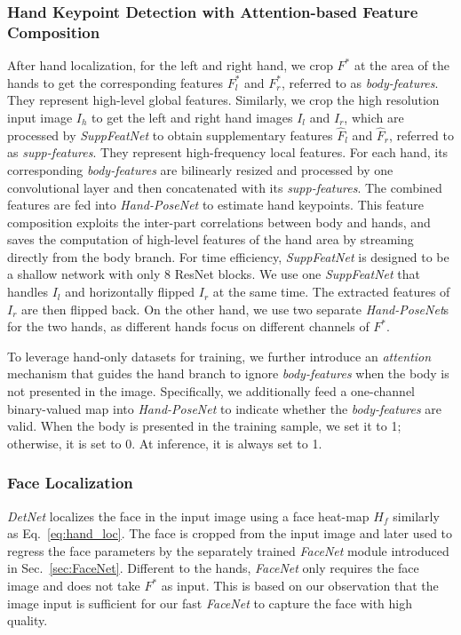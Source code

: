 \documentclass[final]{cvpr}
\begin{document}
\subsubsection{Hand Keypoint Detection with Attention-based Feature Composition \vspace{-1mm}}
After hand localization, for the left and right hand, we crop $F^*$ at the area of the hands to get the corresponding features $F^*_l$ and $F^*_r$, referred to as \textit{body-features}.
They represent high-level global features.
Similarly, we crop the high resolution input image $I_h$ to get the left and right hand images $I_l$ and $I_r$, which are processed by \textit{SuppFeatNet} to obtain supplementary features $\hat{F}_l$ and $\hat{F}_r$, referred to as \textit{supp-features}.
They represent high-frequency local features.
For each hand, its corresponding \textit{body-features} are bilinearly resized and processed by one convolutional layer and then concatenated with its \textit{supp-features}.
The combined features are fed into \textit{Hand-PoseNet} to estimate hand keypoints.
This feature composition exploits the inter-part correlations between body and hands, and saves the computation of high-level features of the hand area by streaming directly from the body branch.
For time efficiency, \textit{SuppFeatNet} is designed to be a shallow network with only 8 ResNet blocks.
We use one \textit{SuppFeatNet} that handles $I_l$ and horizontally flipped $I_r$ at the same time.
The extracted features of $I_r$ are then flipped back.
On the other hand, we use two separate \textit{Hand-PoseNet}s for the two hands, as different hands focus on different channels of $F^*$.
\par
To leverage hand-only datasets for training, we further introduce an \textit{attention} mechanism that guides the hand branch to ignore \textit{body-features} when the body is not presented in the image.
Specifically, we additionally feed a one-channel binary-valued map into \textit{Hand-PoseNet} to indicate whether the \textit{body-features} are valid.
When the body is presented in the training sample, we set it to 1; otherwise, it is set to 0.
At inference, it is always set to 1.
\par
\vspace{-3mm}
\subsubsection{Face Localization \vspace{-1mm}}
\textit{DetNet} localizes the face in the input image using a face heat-map $H_f$ similarly as Eq.~\ref{eq:hand_loc}.
The face is cropped from the input image and later used to regress the face parameters by the separately trained \textit{FaceNet} module introduced in Sec.~\ref{sec:FaceNet}.
Different to the hands, \textit{FaceNet} only requires the face image and does not take $F^*$ as input.
This is based on our observation that the image input is sufficient for our fast \textit{FaceNet} to capture the face with high quality.
\par
\vspace{-3mm}
\end{document}
